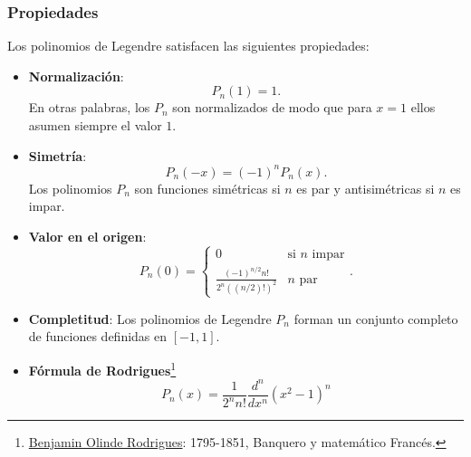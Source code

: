 \subsubsection{Propiedades}
Los polinomios de Legendre satisfacen las siguientes propiedades:
\begin{itemize}
\item \textbf{Normalización}:
\begin{equation}
     P_n(1) = 1.
\end{equation}
En otras palabras, los $P_n$ son normalizados de modo que para $x=1$ ellos
asumen siempre el valor $1$.
 \item \textbf{Simetría}:
\begin{equation}
P_n(-x) = (-1)^n P_n(x).
\end{equation}
Los polinomios $P_n$ son funciones simétricas si $n$ es par y antisimétricas
si $n$ es impar.

\item \textbf{Valor en el origen}:
\begin{equation}\label{Pn0}
P_n(0)=\left\{\begin{array}{cl}
0 & \text{si } n \text{ impar} \\
\frac{(-1)^{n/2}n!}{2^{n}((n/2)!)^2} & n \text{ par}
\end{array}\right. .
\end{equation}

\item \textbf{Completitud}: Los polinomios de Legendre $P_n$ forman un conjunto
completo de funciones definidas en $[-1,1]$.


\item \textbf{Fórmula de Rodrigues}\footnote{\href{https://es.wikipedia.org/wiki/Olinde_Rodrigues}{Benjamin Olinde Rodrigues}: 1795-1851, Banquero y matemático Francés.}
\begin{equation}
P_{n}(x)=\frac{1}{2^{n}n!}\frac{d^{n}}{dx^{n}}(x^2-1)^{n}
\end{equation}

\begin{scriptsize}

\end{scriptsize}
\end{itemize}

